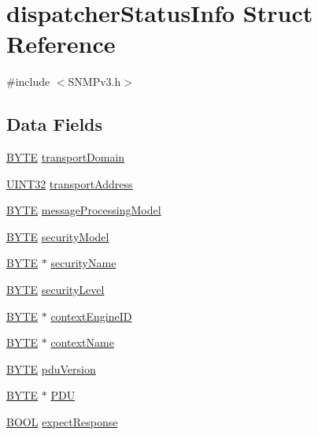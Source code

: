 \hypertarget{structdispatcher_status_info}{}\section{dispatcher\+Status\+Info Struct Reference}
\label{structdispatcher_status_info}


{\ttfamily \#include $<$S\+N\+M\+Pv3.\+h$>$}

\subsection*{Data Fields}
\begin{DoxyCompactItemize}
\item 
\hyperlink{_generic_type_defs_8h_a4ae1dab0fb4b072a66584546209e7d58}{B\+Y\+T\+E} \hyperlink{structdispatcher_status_info_a9caa74f4cfb6917bbf209d8f1de38a9f}{transport\+Domain}
\item 
\hyperlink{_generic_type_defs_8h_a1720f33f59b583f0c2ed071815623a86}{U\+I\+N\+T32} \hyperlink{structdispatcher_status_info_a4943d5b448452380d516089d6a59700c}{transport\+Address}
\item 
\hyperlink{_generic_type_defs_8h_a4ae1dab0fb4b072a66584546209e7d58}{B\+Y\+T\+E} \hyperlink{structdispatcher_status_info_a47f1a1b8f7a3fe5623fe37df094ac032}{message\+Processing\+Model}
\item 
\hyperlink{_generic_type_defs_8h_a4ae1dab0fb4b072a66584546209e7d58}{B\+Y\+T\+E} \hyperlink{structdispatcher_status_info_ac19ed44216346e9d6c50819813db6867}{security\+Model}
\item 
\hyperlink{_generic_type_defs_8h_a4ae1dab0fb4b072a66584546209e7d58}{B\+Y\+T\+E} $\ast$ \hyperlink{structdispatcher_status_info_a4a48a8746988a1f761c3e9eadcc20463}{security\+Name}
\item 
\hyperlink{_generic_type_defs_8h_a4ae1dab0fb4b072a66584546209e7d58}{B\+Y\+T\+E} \hyperlink{structdispatcher_status_info_a9314d7b462ce4cc59202ed48fcdd9945}{security\+Level}
\item 
\hyperlink{_generic_type_defs_8h_a4ae1dab0fb4b072a66584546209e7d58}{B\+Y\+T\+E} $\ast$ \hyperlink{structdispatcher_status_info_aa75baf2d001f5d5ac415eed279fd6e85}{context\+Engine\+I\+D}
\item 
\hyperlink{_generic_type_defs_8h_a4ae1dab0fb4b072a66584546209e7d58}{B\+Y\+T\+E} $\ast$ \hyperlink{structdispatcher_status_info_af55ce5882ccbc8435fb33f1020c74550}{context\+Name}
\item 
\hyperlink{_generic_type_defs_8h_a4ae1dab0fb4b072a66584546209e7d58}{B\+Y\+T\+E} \hyperlink{structdispatcher_status_info_a731491a51ee1a2971e5cd7d7446c1dab}{pdu\+Version}
\item 
\hyperlink{_generic_type_defs_8h_a4ae1dab0fb4b072a66584546209e7d58}{B\+Y\+T\+E} $\ast$ \hyperlink{structdispatcher_status_info_abf0d7b0afb4ebcedb2a0138c9b14fdb5}{P\+D\+U}
\item 
\hyperlink{_generic_type_defs_8h_a54d65c7fa62e62c9754371e42f5111b9}{B\+O\+O\+L} \hyperlink{structdispatcher_status_info_a1f80a620b82899e098699391f19be85e}{expect\+Response}
\end{DoxyCompactItemize}


